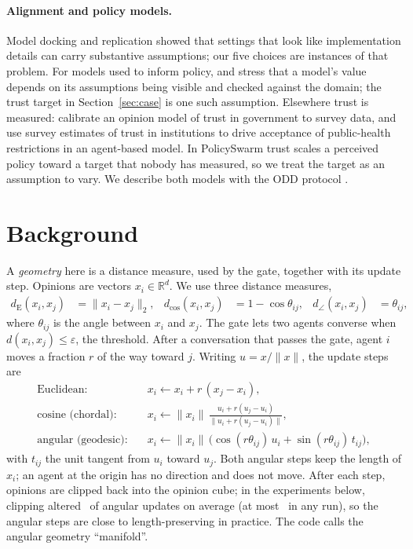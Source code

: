 \documentclass[11pt]{article}
\begin{document}
\paragraph{Alignment and policy models.}
Model docking and replication \citep{axtell1996,wilensky2007} showed that settings that look like implementation details can carry substantive assumptions; our five choices are instances of that problem.
For models used to inform policy, \citet{gilbert2018} and \citet{windrum2007} stress that a model's value depends on its assumptions being visible and checked against the domain; the trust target in Section~\ref{sec:case} is one such assumption.
Elsewhere trust is measured: \citet{gestefeld2023} calibrate an opinion model of trust in government to survey data, and \citet{falcone2023} use survey estimates of trust in institutions to drive acceptance of public-health restrictions in an agent-based model.
In PolicySwarm trust scales a perceived policy toward a target that nobody has measured, so we treat the target as an assumption to vary.
We describe both models with the ODD protocol \citep{grimm2020}.

\section{Background}
\label{sec:background}

A \emph{geometry} here is a distance measure, used by the gate, together with its update step.
Opinions are vectors $x_i \in \mathbb{R}^d$.
We use three distance measures,
\begin{align*}
d_{\mathrm{E}}(x_i,x_j) &= \lVert x_i - x_j \rVert_2, &
d_{\cos}(x_i,x_j) &= 1 - \cos\theta_{ij}, &
d_\angle(x_i,x_j) &= \theta_{ij},
\end{align*}
where $\theta_{ij}$ is the angle between $x_i$ and $x_j$.
The gate lets two agents converse when $d(x_i,x_j) \le \varepsilon$, the threshold.
After a conversation that passes the gate, agent $i$ moves a fraction $r$ of the way toward $j$.
Writing $u = x/\lVert x\rVert$, the update steps are
\begin{align*}
\text{Euclidean:}\quad & x_i \leftarrow x_i + r\,(x_j - x_i),\\
\text{cosine (chordal):}\quad & x_i \leftarrow \lVert x_i\rVert\,\frac{u_i + r(u_j - u_i)}{\lVert u_i + r(u_j - u_i)\rVert},\\
\text{angular (geodesic):}\quad & x_i \leftarrow \lVert x_i\rVert\,\bigl(\cos(r\theta_{ij})\,u_i + \sin(r\theta_{ij})\,t_{ij}\bigr),
\end{align*}
with $t_{ij}$ the unit tangent from $u_i$ toward $u_j$.
Both angular steps keep the length of $x_i$; an agent at the origin has no direction and does not move.
After each step, opinions are clipped back into the opinion cube; in the experiments below, clipping altered \VClipMean\ of angular updates on average (at most \VClipMax\ in any run), so the angular steps are close to length-preserving in practice.
The code calls the angular geometry ``manifold''.
\end{document}

